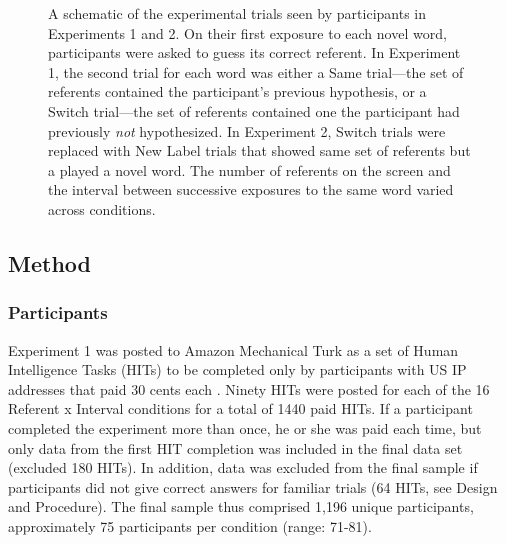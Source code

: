 \documentclass[man,floatsintext]{apa6}
\begin{document}
\begin{figure}[tb]
	\caption{\label{fig:design} A schematic of the experimental trials seen by participants in Experiments 1 and 2. On their first exposure to each novel word, participants were asked to guess its correct referent. In Experiment 1, the second trial for each word was either a Same trial---the set of referents contained the participant's previous hypothesis, or a Switch trial---the set of referents contained one the participant had previously \emph{not} hypothesized. In Experiment 2, Switch trials were replaced with New Label trials that showed same set of referents but a played a novel word. The number of referents on the screen and the interval between successive exposures to the same word varied across conditions.}
\end{figure}

\subsection{Method}

\subsubsection{Participants}

Experiment 1 was posted to Amazon Mechanical Turk as a set of Human Intelligence Tasks (HITs) to be completed only by participants with US IP addresses that paid 30 cents each \cite<for a detailed comparison of laboratory and Mechanical Turk studies see>{Crump2013}. Ninety HITs were posted for each of the 16 Referent x Interval conditions for a total of 1440 paid HITs. If a participant completed the experiment more than once, he or she was paid each time, but only data from the first HIT completion was included in the final data set (excluded 180 HITs). In addition, data was excluded from the final sample if participants did not give correct answers for familiar trials (64 HITs, see Design and Procedure). The final sample thus comprised 1,196 unique participants, approximately 75 participants per condition (range: 71-81).
\end{document}

